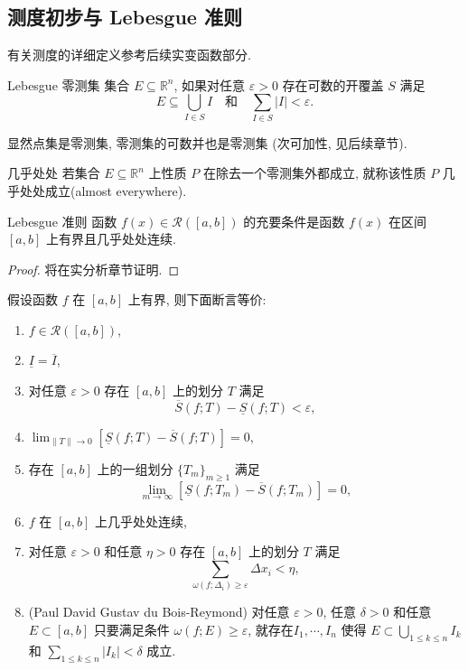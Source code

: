 \documentclass[cn,toc=twocol]{elegantbook}
\newcommand{\ITEMS}{\begin{enumerate}}
\newcommand{\ITEME}{\end{enumerate}}
\newcommand{\R}{\mathbb{R}}
\newcommand{\ds}{\displaystyle}
\begin{document}
\subsection{测度初步与 Lebesgue 准则}
有关测度的详细定义参考后续实变函数部分.

\begin{definition}{Lebesgue 零测集}
	集合 $E \subseteq \R^n$, 如果对任意 $\varepsilon > 0$ 存在可数的开覆盖 $S$ 满足
	\[
		E \subseteq \bigcup\limits_{I \in S}I\quad \text{和} \quad \sum_{I \in S} \lvert I \rvert < \varepsilon.
	\]
\end{definition}
\begin{remark}
	显然点集是零测集, 零测集的可数并也是零测集 (次可加性, 见后续章节).	
\end{remark}

\begin{definition}{几乎处处}
	若集合 $E \subseteq \R^n$ 上性质 $P$ 在除去一个零测集外都成立, 就称该性质 $P$ 几乎处处成立(almost everywhere).
\end{definition}

\begin{theorem}{Lebesgue 准则}
	函数 $f(x) \in \mathscr{R}([a,b])$ 的充要条件是函数 $f(x)$ 在区间 $[a,b]$ 上有界且几乎处处连续.
\end{theorem}
\begin{proof}
	将在实分析章节证明.
\end{proof}

\begin{theorem}
	假设函数 $f$ 在 $[a,b]$ 上有界, 则下面断言等价:
	\ITEMS
		\item $f \in \mathscr{R}([a,b])$,
		\item $\underline{I} = \overline{I}$,
		\item 对任意 $\varepsilon > 0$ 存在 $[a,b]$ 上的划分 $T$ 满足
		\[
			\overline{S}(f; T) - \underline{S}(f; T) < \varepsilon,
		\]
		\item $\ds \lim_{\lVert T \rVert \to 0}[\underline{S}(f; T) - \overline{S}(f; T)] = 0$,
		\item 存在 $[a,b]$ 上的一组划分 $\{T_m\}_{m \ge 1}$ 满足
		\[
			\lim_{m\to\infty}[\underline{S}(f; T_m) - \overline{S}(f; T_m)] = 0,
		\]
		\item $f$ 在 $[a,b]$ 上几乎处处连续,
		\item 对任意 $\varepsilon > 0$ 和任意 $\eta > 0$ 存在 $[a,b]$ 上的划分 $T$ 满足
		\[
			\sum_{\omega(f;\Delta_i) \ge \varepsilon}\Delta x_i < \eta,
		\]
		\item (Paul David Gustav du Bois-Reymond) 对任意 $\varepsilon > 0$, 任意 $\delta > 0$ 和任意 $E \subset [a,b]$ 只要满足条件 $\omega(f; E) \ge \varepsilon$, 就存在$I_1, \cdots, I_n$ 使得 $\ds E \subset \bigcup_{1 \le k \le n} I_k$ 和 $\ds \sum_{1 \le k \le n} \lvert I_k \rvert < \delta$ 成立.
	\ITEME
\end{theorem}
\end{document}

